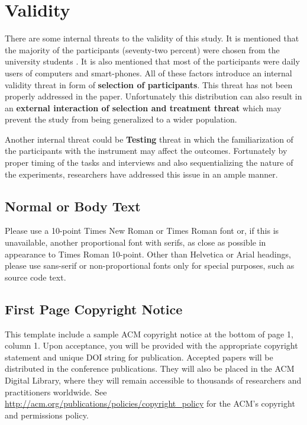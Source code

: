 \documentclass{sigchi}
\begin{document}
\section{Validity}
There are some internal threats to the validity of this study. It is mentioned that the majority of the participants (seventy-two percent) were chosen from the university students \cite{10.1093/iwc/iwv003}. It is also mentioned that most of the participants were daily users of computers and smart-phones. All of these factors introduce an internal validity threat in form of \textbf{selection of participants}. This threat has not been properly addressed in the paper. Unfortunately this distribution can also result in an \textbf{external interaction of selection and treatment threat} which may prevent the study from being generalized to a wider population.

Another internal threat could be \textbf{Testing} threat in which the familiarization of the participants with the instrument may affect the outcomes. Fortunately by proper timing of the tasks and interviews and also sequentializing the nature of the experiments, researchers have addressed this issue in an ample manner.




\subsection{Normal or Body Text}

Please use a 10-point Times New Roman or Times Roman font or, if this
is unavailable, another proportional font with serifs, as close as
possible in appearance to Times Roman 10-point. Other than Helvetica
or Arial headings, please use sans-serif or non-proportional fonts
only for special purposes, such as source code text.

\subsection{First Page Copyright Notice}
This template include a sample ACM copyright notice at the bottom of
page 1, column 1.  Upon acceptance, you will be provided with the
appropriate copyright statement and unique DOI string for publication.
Accepted papers will be distributed in the conference
publications. They will also be placed in the ACM Digital Library,
where they will remain accessible to thousands of researchers and
practitioners worldwide. See
\url{http://acm.org/publications/policies/copyright_policy} for the
ACM's copyright and permissions policy.


\balance{}



\end{document}
